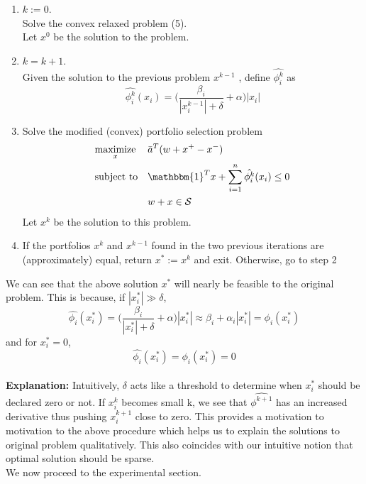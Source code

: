 \documentclass[a4paper]{article}
\begin{document}
\begin{enumerate}
\item
$k:=0.$\\
Solve the convex relaxed problem (5).\\
Let $x^0$ be the solution to the problem.\\
\item
$k=k+1$.\\
Given the solution to the previous problem $x^{k-1}$ , define $\hat{\phi_i^k}$ as
$$
\hat{\phi_i^k}(x_i)= \Big(\frac{\beta_i}{|x_i^{k-1}|+\delta}+ \alpha\Big) |x_i|
$$
\item
Solve the modified (convex) portfolio selection problem
\begin{equation}
\begin{aligned}
& \underset{x}{\text{maximize}}
& & \bar{a}^T (w+x^+ - x^-) \\
& \text{subject to}
& & \mathbbm{1}^Tx + \displaystyle \sum_{i=1}^n \hat{\phi_i^k}(x_i) \leq 0  \\
& & & w+x \in \mathcal{S}\\
\end{aligned}
\end{equation}
Let $x^k$ be the solution to this problem.
\item
If the portfolios $x^k$ and $x^{k-1}$ found in the two previous iterations are (approximately)
equal, return $ x^* := x^k $ and exit.
Otherwise, go to step 2
\end{enumerate}

We can see that the above solution $x^*$ will nearly be feasible to the original problem. This is because, if $|x_i^*| \gg \delta
$,
$$
\hat{\phi_i}(x_i^*)= \Big(\frac{\beta_i}{|x_i^{*}|+\delta}+ \alpha\Big) |x_i^*| \approx \beta_i + \alpha_i |x_i^*| = \phi_i(x_i^*)
$$
and for $x_i^*=0$,
$$
\hat{\phi_i}(x_i^*)=\phi_i(x_i^*)=0
$$
\\

\textbf{Explanation:} Intuitively, $\delta$ acts like a threshold to determine when $x_i^*$ should be declared zero or not. If $x_i^k$ becomes small k, we see that $\hat{\phi^{k+1}}$ has an increased derivative thus pushing $x_i^{k+1}$ close to zero. This provides a motivation to motivation to the above procedure which helps us to explain the solutions to original problem qualitatively. This also coincides with our intuitive notion that optimal solution should be sparse.\\[0.2em]

We now proceed to the experimental section.
\end{document}
